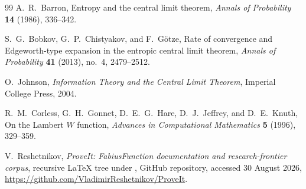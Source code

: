 \documentclass[11pt,oneside]{article}
\theoremstyle{definition}
\theoremstyle{remark}
\begin{document}
\begin{thebibliography}{99}
A.~R.~Barron,
\newblock Entropy and the central limit theorem,
\newblock \emph{Annals of Probability} \textbf{14} (1986), 336--342.

S.~G.~Bobkov, G.~P.~Chistyakov, and F.~G\"otze,
\newblock Rate of convergence and Edgeworth-type expansion in the entropic
central limit theorem,
\newblock \emph{Annals of Probability} \textbf{41} (2013), no.~4, 2479--2512.

O.~Johnson,
\newblock \emph{Information Theory and the Central Limit Theorem},
\newblock Imperial College Press, 2004.

R.~M.~Corless, G.~H.~Gonnet, D.~E.~G.~Hare, D.~J.~Jeffrey, and D.~E.~Knuth,
\newblock On the Lambert $W$ function,
\newblock \emph{Advances in Computational Mathematics} \textbf{5} (1996),
329--359.

V.~Reshetnikov,
\newblock \emph{ProveIt: FabiusFunction documentation and research-frontier
corpus},
\newblock recursive LaTeX tree under
, GitHub repository, accessed 30 August 2026,
\url{https://github.com/VladimirReshetnikov/ProveIt}.

\end{thebibliography}
\end{document}
